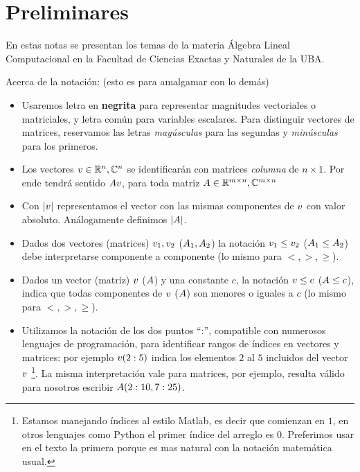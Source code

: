 \chapter*{Preliminares }

En estas notas se presentan los temas de la materia Álgebra Lineal Computacional
en la Facultad de Ciencias Exactas y Naturales de la UBA.



\bigskip


Acerca de la notación: (esto es para amalgamar con lo demás)
\begin{itemize}
\item Usaremos letra en {\bf negrita} para representar magnitudes vectoriales o matriciales, y letra común para variables escalares. Para distinguir vectores de matrices, reservamos las letras \emph{mayúsculas} para las segundas y \emph{minúsculas} para los primeros.
 \item Los vectores $\vb\in \R^n,\C^n$ se identificarán con matrices \emph{columna} de $n\times 1$. Por ende tendrá sentido
 $\Ab\vb$, para toda matriz $\Ab\in \R^{m\times n},\C^{m\times n}$
 \item Con $|\vb|$ representamos el vector con las mismas componentes de $\vb$ con valor absoluto. Análogamente definimos $|\Ab|$.
 \item Dados dos vectores (matrices) $\vb_1,\vb_2$ ($\Ab_1,\Ab_2$) la notación
 $\vb_1\le \vb_2$ ($\Ab_1\le \Ab_2$) debe interpretarse componente a componente (lo mismo para $<,>,\ge$).
 \item Dados un vector (matriz) $\vb$ ($\Ab$) y una constante $c$, la notación
 $\vb\le c$ ($\Ab\le c$), indica que todas componentes de $\vb$ ($\Ab$) son menores o iguales a $c$  (lo mismo para $<,>,\ge$).
 \item Utilizamos la notación de los dos puntos ``:'', compatible con numerosos lenguajes de programación, para identificar rangos de índices en vectores y matrices: por ejemplo $\vb(2:5)$ indica los elementos $2$ al $5$ incluidos del vector $\vb$ \footnote{Estamos manejando índices al estilo Matlab, es decir que comienzan en $1$, en otros lenguajes como Python el primer índice del arreglo es $0$. Preferimos usar en el texto la primera porque es mas natural con la notación matemática usual.}. La misma interpretación vale para matrices, por ejemplo, resulta válido para nosotros escribir $\Ab(2:10,7:25)$.

\end{itemize}
